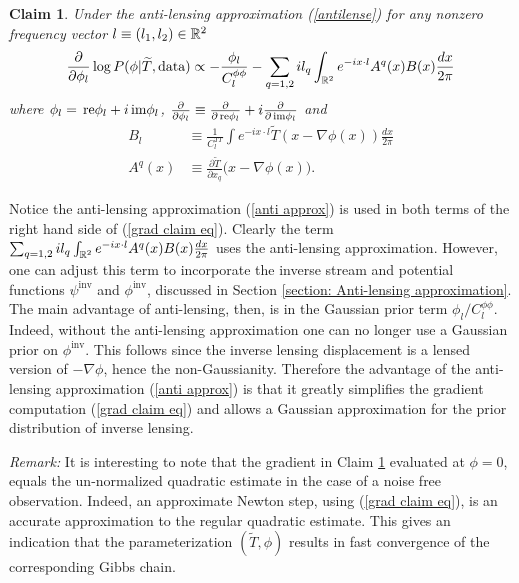 \documentclass[noinfoline]{imsart}
\newtheorem{claim}{Claim}
\newcommand{\re}{\text{\,\rm re}}
\newcommand{\im}{\text{\,\rm im}}
\begin{document}
\begin{claim}
\label{grad claim}
 Under the anti-lensing approximation (\ref{antilense}) for any nonzero frequency vector $l\equiv (l_1, l_2) \in \Bbb R^2$ 
\begin{equation}
\label{grad claim eq}
 \frac{\partial}{\partial \phi_l}\log P(\phi | \widetilde T,  \text{\rm data}) \propto -  \frac{\phi_l}{C^{\phi\phi}_{l}} -  \sum_{q=1,2} i  l_q \int_{\Bbb R^2} e^{-i x\cdot l} A^q(x)B(x) \frac{dx}{2\pi}  
\end{equation}
 where  $\phi_l = \re \phi_l + i \im \phi_l$, $\frac{\partial}{\partial \phi_l}\equiv \frac{\partial}{\partial\re \phi_l} + i \frac{\partial}{\partial\im\phi_l}$ and 
 \begin{align}
 B_l &\equiv \frac{1}{C_l^{TT}} \int e^{-i x\cdot l}  \widetilde T(x-\nabla \phi(x))\frac{dx}{2\pi} \\ 
 A^q(x) &\equiv \frac{\partial\widetilde T}{\partial x_q}\bigl(x-\nabla \phi(x)\bigr).
 \end{align}
\end{claim}


Notice the anti-lensing approximation (\ref{anti approx}) is used in both terms of the right hand side of (\ref{grad claim eq}). Clearly the term $ \sum_{q=1,2} i  l_q \int_{\Bbb R^2} e^{-i x\cdot l} A^q(x)B(x) \frac{dx}{2\pi}  $ uses the anti-lensing approximation. However, one can adjust this term  to incorporate the inverse stream and potential functions $\psi^\text{inv}$ and $\phi^\text{inv}$, discussed in Section \ref{section: Anti-lensing approximation}. The main advantage of anti-lensing, then, is in the Gaussian prior term $\phi_l/{C^{\phi\phi}_{l}}$. 
Indeed, without the anti-lensing approximation one can no longer use a Gaussian prior on $\phi^\text{inv}$. This follows since the inverse lensing displacement is a lensed version of $-\nabla \phi$, hence the non-Gaussianity.  Therefore the advantage of  the anti-lensing approximation (\ref{anti approx}) is that it greatly simplifies the gradient computation (\ref{grad claim eq}) and allows a Gaussian approximation for the prior distribution of inverse lensing. 

{\em Remark:} It is interesting to note that the gradient in Claim \ref{grad claim} evaluated at $\phi = 0$, equals the un-normalized quadratic estimate in the case of a noise free observation. Indeed, an approximate Newton step, using (\ref{grad claim eq}), is an accurate approximation to the regular quadratic estimate. This gives an indication that the parameterization $(\widetilde T, \phi)$ results in fast convergence of the corresponding Gibbs chain.
\end{document}
